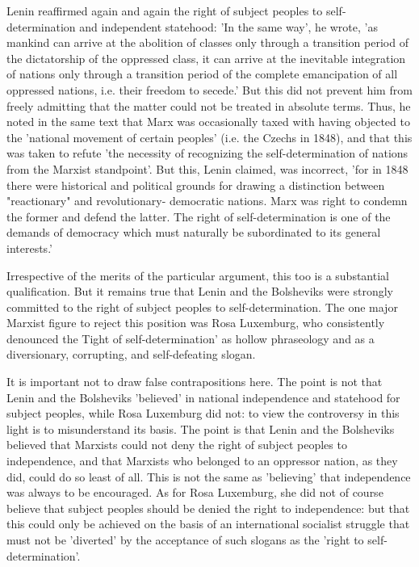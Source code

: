 Lenin reaffirmed again and again the right of subject peoples  to self-determination and independent statehood: 'In the same way', he wrote, 'as mankind can arrive at the abolition of classes only through a transition period of the dictatorship of the oppressed class, it can arrive at the inevitable integration of nations only through a transition period of the complete emancipation of all oppressed nations, i.e. their freedom to secede.' But this did not prevent him from freely admitting that the matter could not be treated in absolute terms. Thus, he noted in the same text that Marx was occasionally taxed with having objected to the 'national movement of certain peoples' (i.e. the Czechs in 1848), and that this was taken to refute 'the necessity of recognizing the self-determination of nations from the Marxist standpoint'. But this, Lenin claimed, was incorrect, 'for in 1848 there were historical and political grounds for drawing a distinction between "reactionary" and revolutionary- democratic nations. Marx was right to condemn the former and defend the latter. The right of self-determination is one of the demands of democracy which must naturally be subordinated to its general interests.'

Irrespective of the merits of the particular argument, this too is a substantial qualification. But it remains true that Lenin and the Bolsheviks were strongly committed to the right of subject peoples to self-determination. The one major Marxist figure to reject this position was Rosa Luxemburg, who consistently denounced the Tight of self-determination' as hollow phraseology and as a diversionary, corrupting, and self-defeating slogan.

It is important not to draw false contrapositions here. The point is not that Lenin and the Bolsheviks 'believed' in national independence and statehood for subject peoples, while Rosa Luxemburg did not: to view the controversy in this light is to misunderstand its basis. The point is that Lenin and the Bolsheviks believed that Marxists could not deny the right of subject peoples to independence, and that Marxists who belonged to an oppressor nation, as they did, could do so least of all. This is not the same as 'believing' that independence was always to be encouraged. As for Rosa Luxemburg, she did not of course believe that subject peoples should be denied the right to independence: but that this could only be achieved on the basis of an international socialist struggle that must not be 'diverted' by the acceptance of such slogans as the 'right to self-determination'.

